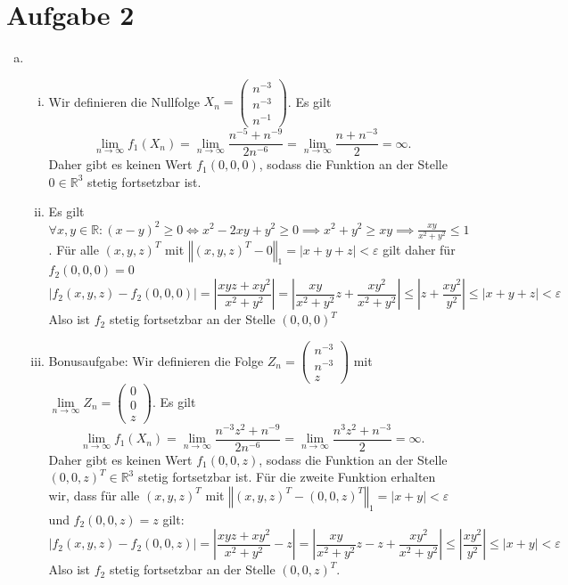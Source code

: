 \documentclass{article}
\theoremstyle{definition}
\newcommand{\equals}{\Longleftrightarrow}
\newcommand{\R}{\mathbb{R}}
\newcommand{\norm}[1]{\left\Vert #1 \right\Vert}
\renewcommand{\epsilon}{\varepsilon}
\begin{document}
\section*{Aufgabe 2}
\begin{enumerate}[(a)]
	\item \begin{enumerate}[(i)]
		\item Wir definieren die Nullfolge $X_n = \begin{pmatrix}
			n^{-3}\\n^{-3}\\n^{-1}
		\end{pmatrix}$. Es gilt \[\lim\limits_{n\to \infty} f_1(X_n) = \lim\limits_{n\to \infty} \frac{n^{-5} + n^{-9}}{2n^{-6}} = \lim\limits_{n\to \infty} \frac{n + n^{-3}}{2} = \infty.\] Daher gibt es keinen Wert $f_1(0,0,0)$, sodass die Funktion an der Stelle $0\in \R^3$ stetig fortsetzbar ist.
		\item Es gilt $\forall x, y \in \R: (x-y)^2 \geq 0 \equals x^2 - 2xy + y^2 \geq 0 \implies x^2 + y^2 \geq xy \implies \frac{xy}{x^2 + y^2}\leq 1$. Für alle $(x,y,z)^T$ mit $\norm{(x,y,z)^T - 0}_1 = |x + y +z| < \epsilon$ gilt daher für $f_2(0,0,0) = 0$ \[|f_2(x,y,z)-f_2(0,0,0)|\! =\! \left|\frac{xyz + xy^2}{x^2+y^2}\right|\! =\! \left|\frac{xy}{x^2+y^2}z + \frac{xy^2}{x^2 + y^2}\right| \leq \left|z + \frac{xy^2}{y^2}\right| \leq \left|x+y+z\right| < \epsilon\] Also ist $f_2$ stetig fortsetzbar an der Stelle $(0,0,0)^T$
		\item Bonusaufgabe: Wir definieren die Folge $Z_n = \begin{pmatrix}
			n^{-3}\\n^{-3}\\z
		\end{pmatrix}$ mit $\lim\limits_{n\to \infty} Z_n = \begin{pmatrix}
			0\\0\\z
		\end{pmatrix}$. Es gilt \[\lim\limits_{n\to \infty} f_1(X_n) = \lim\limits_{n\to \infty} \frac{n^{-3}z^2 + n^{-9}}{2n^{-6}} = \lim\limits_{n\to \infty} \frac{n^3z^2 + n^{-3}}{2} = \infty.\] Daher gibt es keinen Wert $f_1(0,0,z)$, sodass die Funktion an der Stelle $(0,0,z)^T\in \R^3$ stetig fortsetzbar ist. Für die zweite Funktion erhalten wir, dass für alle $(x,y,z)^T$ mit $\norm{(x,y,z)^T - (0,0,z)^T}_1 = |x + y| < \epsilon$ und $f_2(0,0,z) = z$ gilt: \[|f_2(x,y,z)-f_2(0,0,z)|\! =\! \left|\frac{xyz + xy^2}{x^2+y^2}-z\right|\! =\! \left|\frac{xy}{x^2+y^2}z -z + \frac{xy^2}{x^2 + y^2}\right| \leq \left|\frac{xy^2}{y^2}\right| \leq \left|x+y\right| < \epsilon\] Also ist $f_2$ stetig fortsetzbar an der Stelle $(0,0,z)^T$.

\end{enumerate}
\end{enumerate}
\end{document}
